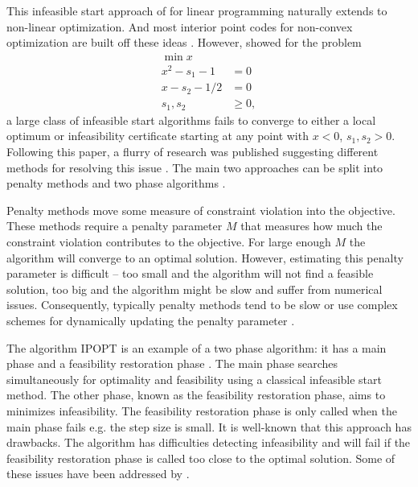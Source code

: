 \documentclass{article}
\begin{document}

This infeasible start approach of \cite{lustig1990feasibility} for linear programming naturally extends to non-linear optimization. 
 
And most interior point codes for non-convex optimization are built off these ideas \cite{vanderbei1999loqo,wachter2006implementation,byrd2006knitro}. However, \cite{wachter2000failure} showed for the problem
\begin{subequations}\label{failure-ex}
\begin{flalign}
\min { x }\\
x^2 - s_1 - 1 &= 0 \\
x - s_2 - 1/2 &= 0 \\
s_1, s_2 &\ge 0,
\end{flalign}
\end{subequations}
a large class of infeasible start algorithms fails to converge to either a local optimum or infeasibility certificate starting at any point with $x < 0$, $s_{1}, s_{2} > 0$. Following this paper, a flurry of research was published suggesting different methods for resolving this issue \cite{benson2004interior}. The main two approaches can be split into penalty methods \cite{liu2004robust, chen2006interior,curtis2012penalty,gould2015interior} and two phase algorithms \cite{wachter2006implementation}. 

Penalty methods move some measure of constraint violation into the objective. These methods require a penalty parameter $M$ that measures how much the constraint violation contributes to the objective. For large enough $M$ the algorithm will converge to an optimal solution. However, estimating this penalty parameter is difficult -- too small and the algorithm will not find a feasible solution, too big and the algorithm might be slow and suffer from numerical issues. Consequently, typically penalty methods tend to be slow \cite[Algorithm 1]{curtis2012penalty} or use complex schemes for dynamically updating the penalty parameter \cite[Algorithm 2]{curtis2012penalty}. 

The algorithm IPOPT is an example of a two phase algorithm: it has a main phase and a feasibility restoration phase  \cite{wachter2006implementation}. The main phase searches simultaneously for optimality and feasibility using a classical infeasible start method. The other phase, known as the feasibility restoration phase, aims to minimizes infeasibility. The feasibility restoration phase is only called when the main phase fails e.g. the step size is small. It is well-known that this approach has drawbacks. The algorithm has difficulties detecting infeasibility \cite[Table 15]{huang2016solution} and will fail if the feasibility restoration phase is called too close to the optimal solution. Some of these issues have been addressed by \cite{nocedal2014interior}. 
\end{document}
